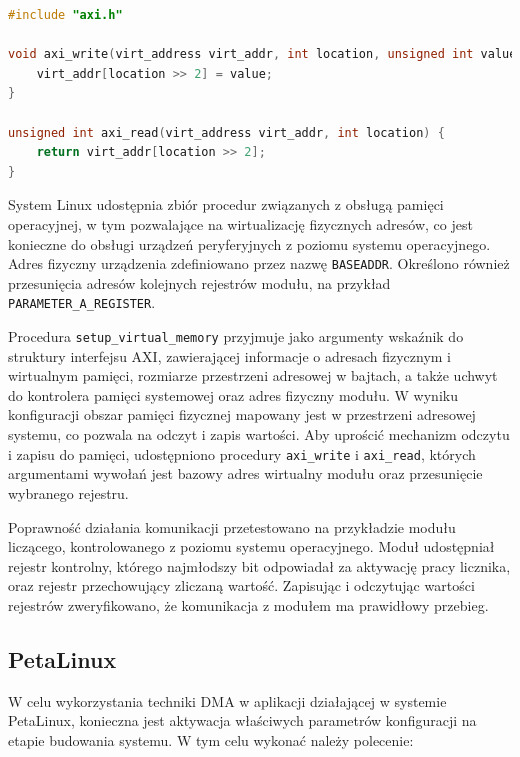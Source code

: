 \begin{lstlisting}[breaklines, language=C, label=lis:axi-dma-petalinux-axi-c, caption=Obsługa modułu w trybie systemowym - \texttt{axi.c}.]
#include "axi.h"

void axi_write(virt_address virt_addr, int location, unsigned int value) {
	virt_addr[location >> 2] = value;
}

unsigned int axi_read(virt_address virt_addr, int location) {
	return virt_addr[location >> 2];
}
\end{lstlisting}


System Linux udostępnia zbiór procedur związanych z obsługą pamięci operacyjnej, w tym pozwalające na wirtualizację fizycznych adresów, co jest konieczne do obsługi urządzeń peryferyjnych z poziomu systemu operacyjnego.
Adres fizyczny urządzenia zdefiniowano przez nazwę \texttt{BASEADDR}. Określono również przesunięcia adresów kolejnych rejestrów modułu, na przykład \texttt{PARAMETER\_A\_REGISTER}.

Procedura \texttt{setup\_virtual\_memory} przyjmuje jako argumenty wskaźnik do struktury interfejsu AXI, zawierającej informacje o adresach fizycznym i wirtualnym pamięci, rozmiarze przestrzeni adresowej w bajtach, a także uchwyt do kontrolera pamięci systemowej oraz adres fizyczny modułu.
W wyniku konfiguracji obszar pamięci fizycznej mapowany jest w przestrzeni adresowej systemu, co pozwala na odczyt i zapis wartości.
Aby uprościć mechanizm odczytu i zapisu do pamięci, udostępniono procedury \texttt{axi\_write} i \texttt{axi\_read}, których argumentami wywołań jest bazowy adres wirtualny modułu oraz przesunięcie wybranego rejestru.

Poprawność działania komunikacji przetestowano na przykładzie modułu liczącego, kontrolowanego z poziomu systemu operacyjnego. 
Moduł udostępniał rejestr kontrolny, którego najmłodszy bit odpowiadał za aktywację pracy licznika, oraz rejestr przechowujący zliczaną wartość. Zapisując i odczytując wartości rejestrów zweryfikowano, że komunikacja z modułem ma prawidłowy przebieg.

\subsection{PetaLinux}
\label{sec:vivado-axi-dma-petalinux}

W celu wykorzystania techniki DMA w aplikacji działającej w systemie PetaLinux, konieczna jest aktywacja właściwych parametrów konfiguracji na etapie budowania systemu. 
W tym celu wykonać należy polecenie:

